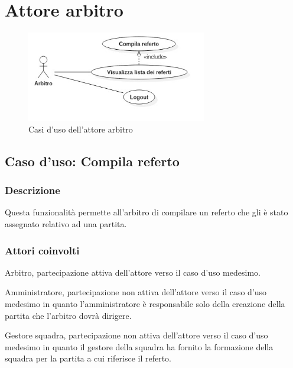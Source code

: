 
\clearpage

\section{Attore arbitro}
%
%
\begin{figure}[h]
	\centering
	\includegraphics[width=0.7\textwidth]
	{immagini/uc-arbitro}
	
	\caption{Casi d'uso dell'attore arbitro}
\end{figure}


%
%
\subsection{Caso d'uso: Compila referto}

\subsubsection*{Descrizione}
Questa funzionalità permette all'arbitro di compilare un referto che gli è stato assegnato relativo ad una partita.

\subsubsection*{Attori coinvolti}
Arbitro, partecipazione attiva dell'attore verso il caso d'uso medesimo.

Amministratore, partecipazione non attiva dell'attore verso il caso d'uso medesimo in quanto l'amministratore è responsabile solo della creazione della partita che l'arbitro dovrà dirigere.

Gestore squadra, partecipazione non attiva dell'attore verso il caso d'uso medesimo in quanto il gestore della squadra ha fornito la formazione della squadra per la partita a cui riferisce il referto.

